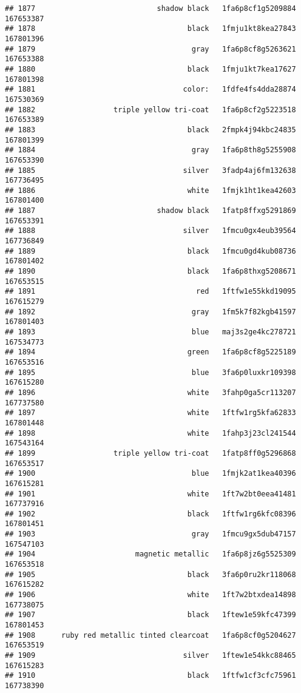 \documentclass[
]{article}
\begin{document}
\begin{verbatim}
## 1877                            shadow black   1fa6p8cf1g5209884 167653387
## 1878                                   black   1fmju1kt8kea27843 167801396
## 1879                                    gray   1fa6p8cf8g5263621 167653388
## 1880                                   black   1fmju1kt7kea17627 167801398
## 1881                                  color:   1fdfe4fs4dda28874 167530369
## 1882                  triple yellow tri-coat   1fa6p8cf2g5223518 167653389
## 1883                                   black   2fmpk4j94kbc24835 167801399
## 1884                                    gray   1fa6p8th8g5255908 167653390
## 1885                                  silver   3fadp4aj6fm132638 167736495
## 1886                                   white   1fmjk1ht1kea42603 167801400
## 1887                            shadow black   1fatp8ffxg5291869 167653391
## 1888                                  silver   1fmcu0gx4eub39564 167736849
## 1889                                   black   1fmcu0gd4kub08736 167801402
## 1890                                   black   1fa6p8thxg5208671 167653515
## 1891                                     red   1ftfw1e55kkd19095 167615279
## 1892                                    gray   1fm5k7f82kgb41597 167801403
## 1893                                    blue   maj3s2ge4kc278721 167534773
## 1894                                   green   1fa6p8cf8g5225189 167653516
## 1895                                    blue   3fa6p0luxkr109398 167615280
## 1896                                   white   3fahp0ga5cr113207 167737580
## 1897                                   white   1ftfw1rg5kfa62833 167801448
## 1898                                   white   1fahp3j23cl241544 167543164
## 1899                  triple yellow tri-coat   1fatp8ff0g5296868 167653517
## 1900                                    blue   1fmjk2at1kea40396 167615281
## 1901                                   white   1ft7w2bt0eea41481 167737916
## 1902                                   black   1ftfw1rg6kfc08396 167801451
## 1903                                    gray   1fmcu9gx5dub47157 167547103
## 1904                       magnetic metallic   1fa6p8jz6g5525309 167653518
## 1905                                   black   3fa6p0ru2kr118068 167615282
## 1906                                   white   1ft7w2btxdea14898 167738075
## 1907                                   black   1ftew1e59kfc47399 167801453
## 1908      ruby red metallic tinted clearcoat   1fa6p8cf0g5204627 167653519
## 1909                                  silver   1ftew1e54kkc88465 167615283
## 1910                                   black   1ftfw1cf3cfc75961 167738390

\end{verbatim}
\end{document}
